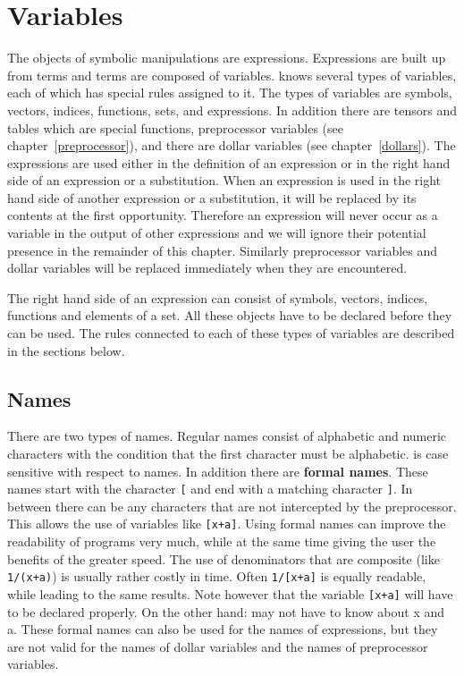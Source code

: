 
\chapter{Variables}
\label{ch-variables}

The objects of symbolic manipulations are expressions. 
Expressions are built up from terms and terms are composed of 
variables. {\FORM} knows several types of variables, each 
of which has special rules assigned to it. The types of variables are 
symbols, vectors, indices, functions, sets, and expressions. In addition 
there are tensors and tables which are special functions, preprocessor 
variables (see chapter~\ref{preprocessor}),
and there are dollar variables (see 
chapter~\ref{dollars}). The expressions are used either in the definition 
of an expression or in the right hand side of an expression or a 
substitution. When an expression is used in the right hand side of another 
expression or a substitution, it will be replaced by its contents at the 
first opportunity. Therefore an expression will never occur as a variable 
in the output of other expressions and we will ignore their potential 
presence in the remainder of this chapter. Similarly preprocessor variables 
and  dollar variables will be replaced immediately when they are 
encountered.

The right hand side of an expression can consist of symbols, vectors, 
indices, functions and elements of a set. All these objects have to be 
declared before they can be used. The rules 
connected to each of these types of variables are described in the 
sections below.

\section{Names}

There are two types of names. Regular 
names consist of alphabetic and numeric characters 
with the condition that the first character must be alphabetic. {\FORM} is 
case sensitive with respect to names. In addition there are {\bf formal 
names}. These names start with the character \verb:[: and end with a 
matching character \verb:]:. In between there can be any characters that 
are not intercepted by the preprocessor. This allows the use of variables 
like \verb:[x+a]:. Using formal names can improve the readability of 
programs very much, while at the same time giving the user the benefits of 
the greater speed. The use of denominators that are 
composite (like \verb:1/(x+a):) is usually rather costly in time. Often 
\verb:1/[x+a]: is equally readable, while leading to the same results. Note 
however that the variable \verb:[x+a]: will have to be declared properly. 
On the other hand: {\FORM} may not have to know about x and a. These formal 
names can also be used for the names of expressions, but they are not valid 
for the names of dollar variables and the names of 
preprocessor variables.

